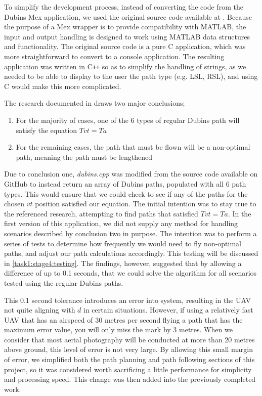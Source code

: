 To simplify the development process, instead of converting the code from the Dubins Mex application, we used the original source code available at \cite{WalkerDubinsCurves}. Because the purpose of a Mex wrapper is to provide compatibility with MATLAB, the input and output handling is designed to work using MATLAB data structures and functionality. The original source code is a pure C application, which was more straightforward to convert to a console application. The resulting application was written in C\texttt{++} so as to simplify the handling of strings, as we needed to be able to display to the user the path type (e.g. LSL, RSL), and using C would make this more complicated. 

The research documented in \cite{mcgee2005optimal} draws two major conclusions;

\begin{enumerate}
	\item For the majority of cases, one of the 6 types of regular Dubins path will satisfy the equation $Tvt = Ta$
	\item For the remaining cases, the path that must be flown will be a non-optimal path, meaning the path must be lengthened 
\end{enumerate}

Due to conclusion one, \textit{dubins.cpp} was modified from the source code available on GitHub to instead return an array of Dubins paths, populated with all 6 path types. This would ensure that we could check to see if any of the paths for the chosen $vt$ position satisfied our equation. The initial intention was to stay true to the referenced research, attempting to find paths that satisfied $Tvt = Ta$. In the first version of this application, we did not supply any method for handling scenarios described by conclusion two in purpose. The intention was to perform a series of tests to determine how frequently we would need to fly non-optimal paths, and adjust our path calculations accordingly. This testing will be discussed in \ref{task1:stage4:testing}. The findings, however, suggested that by allowing a difference of up to 0.1 seconds, that we could solve the algorithm for all scenarios tested using the regular Dubins paths. 

This 0.1 second tolerance introduces an error into system, resulting in the UAV not quite aligning with $d$ in certain situations. However, if using a relatively fast UAV that has an airspeed of 30 metres per second flying a path that has the maximum error value, you will only miss the mark by 3 metres. When we consider that most aerial photography will be conducted at more than 20 metres above ground, this level of error is not very large. By allowing this small margin of error, we simplified both the path planning and path following sections of this project, so it was considered worth sacrificing a little performance for simplicity and processing speed. This change was then added into the previously completed work.

